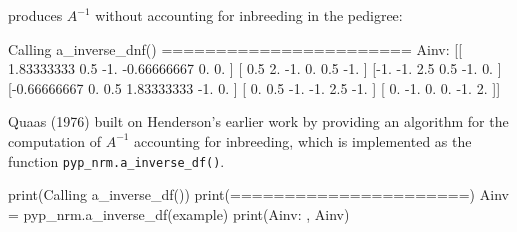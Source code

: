 \documentclass[
  letterpaper,
  DIV=11,
  numbers=noendperiod]{scrreprt}
\newenvironment{Shaded}{\begin{snugshade}}{\end{snugshade}}
\newcommand{\BuiltInTok}[1]{\textcolor[rgb]{0.00,0.23,0.31}{#1}}
\newcommand{\FloatTok}[1]{\textcolor[rgb]{0.68,0.00,0.00}{#1}}
\newcommand{\NormalTok}[1]{\textcolor[rgb]{0.00,0.23,0.31}{#1}}
\newcommand{\OperatorTok}[1]{\textcolor[rgb]{0.37,0.37,0.37}{#1}}
\newcommand{\StringTok}[1]{\textcolor[rgb]{0.13,0.47,0.30}{#1}}
\begin{document}
produces \(A^{-1}\) without accounting for inbreeding in the pedigree:

\begin{Shaded}
\begin{Highlighting}[]
\NormalTok{Calling a\_inverse\_dnf()}
\OperatorTok{=======================}
\NormalTok{Ainv:  [[ }\FloatTok{1.83333333}  \FloatTok{0.5}        \OperatorTok{{-}}\FloatTok{1.}         \OperatorTok{{-}}\FloatTok{0.66666667}  \FloatTok{0.}          \FloatTok{0.}\NormalTok{        ]}
\NormalTok{ [ }\FloatTok{0.5}         \FloatTok{2.}         \OperatorTok{{-}}\FloatTok{1.}          \FloatTok{0.}          \FloatTok{0.5}        \OperatorTok{{-}}\FloatTok{1.}\NormalTok{        ]}
\NormalTok{ [}\OperatorTok{{-}}\FloatTok{1.}         \OperatorTok{{-}}\FloatTok{1.}          \FloatTok{2.5}         \FloatTok{0.5}        \OperatorTok{{-}}\FloatTok{1.}          \FloatTok{0.}\NormalTok{        ]}
\NormalTok{ [}\OperatorTok{{-}}\FloatTok{0.66666667}  \FloatTok{0.}          \FloatTok{0.5}         \FloatTok{1.83333333} \OperatorTok{{-}}\FloatTok{1.}          \FloatTok{0.}\NormalTok{        ]}
\NormalTok{ [ }\FloatTok{0.}          \FloatTok{0.5}        \OperatorTok{{-}}\FloatTok{1.}         \OperatorTok{{-}}\FloatTok{1.}          \FloatTok{2.5}        \OperatorTok{{-}}\FloatTok{1.}\NormalTok{        ]}
\NormalTok{ [ }\FloatTok{0.}         \OperatorTok{{-}}\FloatTok{1.}          \FloatTok{0.}          \FloatTok{0.}         \OperatorTok{{-}}\FloatTok{1.}          \FloatTok{2.}\NormalTok{        ]]}
\end{Highlighting}
\end{Shaded}

Quaas (1976) built on Henderson's earlier work by providing an algorithm
for the computation of \(A^{-1}\) accounting for inbreeding, which is
implemented as the function \texttt{pyp\_nrm.a\_inverse\_df()}.

\begin{Shaded}
\begin{Highlighting}[]
\BuiltInTok{print}\NormalTok{(}\StringTok{\textquotesingle{}Calling a\_inverse\_df()\textquotesingle{}}\NormalTok{)}
\BuiltInTok{print}\NormalTok{(}\StringTok{\textquotesingle{}======================\textquotesingle{}}\NormalTok{)}
\NormalTok{Ainv }\OperatorTok{=}\NormalTok{ pyp\_nrm.a\_inverse\_df(example)}
\BuiltInTok{print}\NormalTok{(}\StringTok{\textquotesingle{}Ainv: \textquotesingle{}}\NormalTok{, Ainv)}
\end{Highlighting}
\end{Shaded}
\end{document}
